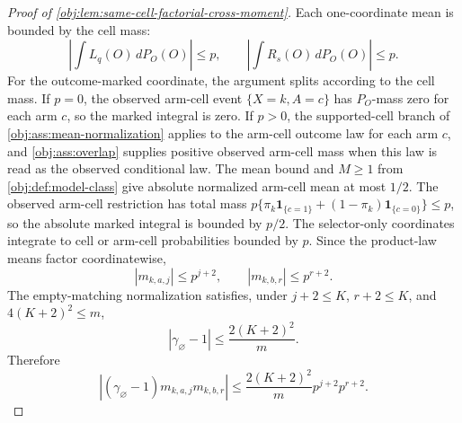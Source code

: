 \documentclass[11pt]{article}
\begin{document}
\begin{proof}[Proof of \cref{obj:lem:same-cell-factorial-cross-moment}]
Each one-coordinate mean is bounded by the cell mass:
\[
\left|\int L_q(O)\,dP_O(O)\right|\le p,
\qquad
\left|\int R_s(O)\,dP_O(O)\right|\le p.
\]
For the outcome-marked coordinate, the argument splits according to the cell mass. If \(p=0\), the observed arm-cell event \(\{X=k,A=c\}\) has \(P_O\)-mass zero for each arm \(c\), so the marked integral is zero. If \(p>0\), the supported-cell branch of \cref{obj:ass:mean-normalization} applies to the arm-cell outcome law for each arm \(c\), and \cref{obj:ass:overlap} supplies positive observed arm-cell mass when this law is read as the observed conditional law. The mean bound and \(M\ge1\) from \cref{obj:def:model-class} give absolute normalized arm-cell mean at most \(1/2\). The observed arm-cell restriction has total mass
\(p\{\pi_k\mathbf 1_{\{c=1\}}+(1-\pi_k)\mathbf 1_{\{c=0\}}\}\le p\), so the absolute marked integral is bounded by \(p/2\). The selector-only coordinates integrate to cell or arm-cell probabilities bounded by \(p\). Since the product-law means factor coordinatewise,
\[
|m_{k,a,j}|\le p^{j+2},
\qquad
|m_{k,b,r}|\le p^{r+2}.
\]
The empty-matching normalization satisfies, under \(j+2\le K\), \(r+2\le K\), and \(4(K+2)^2\le m\),
\[
|\gamma_\varnothing-1|
\le
\frac{2(K+2)^2}{m}.
\]
Therefore
\[
|(\gamma_\varnothing-1)m_{k,a,j}m_{k,b,r}|
\le
\frac{2(K+2)^2}{m}p^{j+2}p^{r+2}.
\]


\end{proof}
\end{document}
